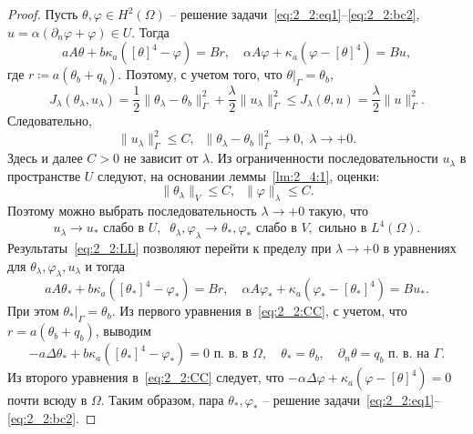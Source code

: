\begin{proof}
    Пусть $\theta,\varphi\in H^2(\Omega)$ -- решение
    задачи~\eqref{eq:2_2:eq1}--\eqref{eq:2_2:bc2},
    $u=\alpha(\partial_n\varphi + \varphi)\in U$.
    Тогда
    \[
        a A \theta + b \kappa_a ([\theta]^4 - \varphi ) = Br,\quad
        \alpha A \varphi + \kappa_a (\varphi - [\theta]^4) = Bu,
    \]
    где $r \coloneqq a(\theta_b+q_b)$.
    Поэтому, с учетом того, что $\theta|_\Gamma=\theta_b$,
    \[
        J_\lambda(\theta_\lambda, u_\lambda)
        = \frac{1}{2}\|\theta_\lambda -\theta_b\|^2_\Gamma
        + \frac{\lambda}{2}\|u_\lambda\|^2_\Gamma
        \leq J_\lambda(\theta, u) = \frac{\lambda}{2}\|u\|^2_\Gamma.
    \]
    Следовательно,
    \[
        \|u_\lambda\|^2_\Gamma\leq C,\;\; \|\theta_\lambda
        -\theta_b\|^2_\Gamma\to 0,\; \lambda\to + 0.
    \]
    Здесь и далее $C>0$ не зависит от $\lambda$.
    Из ограниченности последовательности $u_\lambda$ в пространстве $U$ следуют, на основании
    леммы~\ref{lm:2_4:1}, оценки:
    \[
        \|\theta_\lambda\|_V \leq C,\;\;
        \|\varphi\|_\lambda \leq C.
    \]
    Поэтому можно выбрать последовательность $\lambda\to+0$ такую, что
    \begin{equation}
        \label{eq:2_2:LL}
        u_\lambda \rightarrow u_* \text{  слабо в } U, \;\;
        \theta_\lambda, \varphi_\lambda \rightarrow \theta_*,\varphi_*
        \text{ слабо в } V, \text{ сильно в } L^4(\Omega).
    \end{equation}
    Результаты~\eqref{eq:2_2:LL} позволяют перейти к пределу при $\lambda\to+0$
    в уравнениях для $\theta_\lambda,\varphi_\lambda,u_\lambda$ и тогда
    \begin{equation}
        \label{eq:2_2:CC}
        a A \theta_* + b \kappa_a ([\theta_*]^4 - \varphi_* ) = Br,\quad
        \alpha A \varphi_* + \kappa_a (\varphi_* - [\theta_*]^4)  = Bu_*.
    \end{equation}
    При этом $\theta_*|_\Gamma=\theta_b$.
    Из первого уравнения в~\eqref{eq:2_2:CC}, с учетом, что $r = a(\theta_b + q_b)$,
    выводим
    \[
        - a\Delta\theta_* + b\kappa_a([\theta_*]^4- \varphi_*) = 0 \text{ п.\ в. в }\Omega,
        \quad \theta_*=\theta_b,\quad \partial_n\theta = q_b \text{ п.\ в. на }\Gamma.
    \]
    Из второго уравнения в~\eqref{eq:2_2:CC} следует, что
    $-\alpha \Delta \varphi + \kappa_a(\varphi-[\theta]^4) = 0$ почти всюду в $\Omega$.
    Таким образом, пара $\theta_*,\varphi_*$
    -- решение задачи~\eqref{eq:2_2:eq1}--\eqref{eq:2_2:bc2}.
\end{proof}

